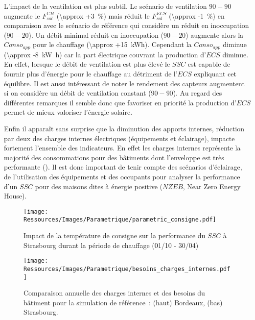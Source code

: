 L’impact de la ventilation est plus subtil. Le scénario de ventilation $90-90$
augmente le $F_{sol}^{CH}$ (\SI{\approx +3}{\percent}) mais réduit le $F_{sol}^{ECS}$
(\SI{\approx -1}{\percent}) en comparaison avec le scénario de référence qui considère un
réduit en inoccupation ($90-20$). Un débit minimal réduit en inoccupation ($90-20$) augmente
alors la $Conso_{app}$ pour le chauffage (\SI{\approx +15}{kWh}). Cependant la
$Conso_{app}$ diminue (\SI{\approx -8}{\kilo\watt\hour}) car la part
électrique couvrant la production d’$ECS$ diminue. En effet, lorsque le débit de ventilation
est plus élevé le $SSC$ est capable de fournir plus d’énergie pour le chauffage au
détriment de l’$ECS$ expliquant cet équilibre. Il est aussi intéressant de noter le
rendement des capteurs augmentent si on considère un débit de ventilation constant
($90-90$). Au regard des différentes remarques il semble donc que
favoriser en priorité la production d’$ECS$ permet de mieux valoriser l’énergie solaire.

Enfin il apparaît sans surprise que la diminution des apports internes, réduction par deux
des charges internes électriques (équipements et éclairage), impacte fortement l’ensemble
des indicateurs. En effet les charges internes représente la majorité des consommations
pour des bâtiments dont l’enveloppe est très performante ().
Il est donc important de tenir compte des scénarios d’éclairage, de l’utilisation des
équipements et des occupants pour analyser la performance d’un $SSC$ pour des maisons
dites à énergie positive ($NZEB$, Near Zero Energy House).

\begin{figure}
    \centering
    \texttt{[image: Ressources/Images/Parametrique/parametric\_consigne.pdf]}
    \caption{Impact de la température de consigne sur la performance
             du $SSC$ à Strasbourg durant la période de chauffage (01/10 - 30/04)
             \label{fig:impact_temp_consigne}}
\end{figure}

\begin{figure}
    \centering
    \texttt{[image: Ressources/Images/Parametrique/besoins\_charges\_internes.pdf]}
    \caption{Comparaison annuelle des charges internes et des besoins du bâtiment
             pour la simulation de référence~: (haut) Bordeaux, (bas) Strasbourg.
             \label{fig:besoins_charges_internes}}
\end{figure}


